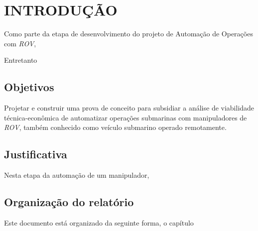 \chapter{INTRODUÇÃO}
\label{chap:intro}
Como parte da etapa de desenvolvimento do projeto de Automação de Operações com \textit{\acs{ROV}}, \cite{pybullet}

\cite{sivvcev2018underwater}

Entretanto

\section{Objetivos}
\label{sec:obj}
Projetar e construir uma prova de conceito para subsidiar a análise de viabilidade técnica-econômica de automatizar operações submarinas com manipuladores de \textit{\acs{ROV}}, também conhecido como veículo submarino operado remotamente.


\section{Justificativa} %
\label{sec:just}
Nesta etapa da automação de um manipulador, 


\section{Organização do relatório}
\label{sec:org}
Este documento está organizado da seguinte forma, o capítulo 



